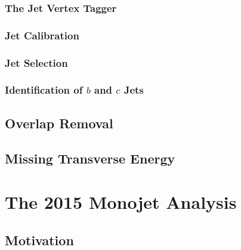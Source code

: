 \documentclass[10pt,twoside,cucitura,classica,english,openany]{toptesi}
\begin{document}


\subsection{The Jet Vertex Tagger }
\label{sec:jet-vertex-tagger}



\subsection{Jet Calibration}
\label{sec:jet-calibration}



\subsection{Jet Selection}
\label{sec:jet-selection}



\subsection{Identification of $b$ and $c$ Jets}
\label{sec:b-jets}



\section{Overlap Removal}
\label{sec:overlap-removal}



\section{Missing Transverse Energy}
\label{sec:miss-transv-energy}



\chapter{The 2015 Monojet Analysis}
\label{cha:monojet-signature}

\section{Motivation}
\label{sec:motivation}


\end{document}

